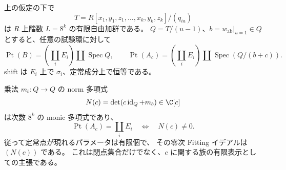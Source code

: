 \begin{theorem}[一中心変数での定常点の有限判定]
\label{cmo:thm:point-norm}
上の仮定の下で
\[
 T=R[x_1,y_1,z_1,\ldots,x_k,y_k,z_k]/(q_{ia})
\]
は $R$ 上階数 $L=8^k$ の有限自由加群である。
$Q=T/(u-1)$、$b=w_{\mathrm{ab}}|_{u=1}\in Q$ とすると、任意の試験環に対して
\begin{equation}\label{cmo:eq:point-scheme}
 \operatorname{Pt}(B)=\left(\coprod_i E_i\right)\amalg\operatorname{Spec}Q,
 \qquad
 \operatorname{Pt}(A_c)=\left(\coprod_i E_i\right)
                  \amalg\operatorname{Spec}(Q/(b+c)).
\end{equation}
shift は $E_i$ 上で $\sigma_i$、定常成分上で恒等である。

乗法 $m_b:Q\to Q$ の norm 多項式
\begin{equation}\label{cmo:eq:norm}
 N(c)=\det(c\operatorname{id}_Q+m_b)\in\C[c]
\end{equation}
は次数 $8^k$ の monic 多項式であり、
\[
 \operatorname{Pt}(A_c)=\coprod_iE_i
 \quad\Longleftrightarrow\quad N(c)\ne0.
\]
従って定常点が現れるパラメータは有限個で、
その零次 Fitting イデアルは $(N(c))$ である。
これは閉点集合だけでなく、$c$ に関する族の有限表示としての主張である。
\end{theorem}

